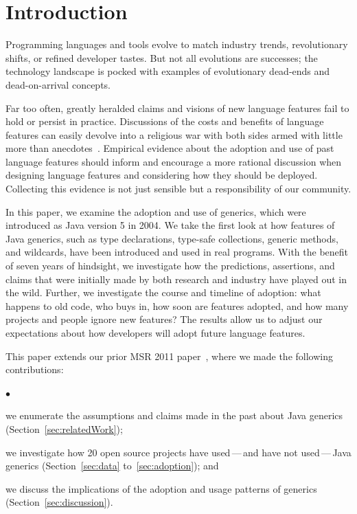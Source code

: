 \documentclass{svjour3}
\newcommand{\squishlist}{
   \begin{list}{$\bullet$}
    { \setlength{\itemsep}{0pt}      \setlength{\parsep}{3pt}
      \setlength{\topsep}{3pt}       \setlength{\partopsep}{0pt}
      \setlength{\leftmargin}{1.5em} \setlength{\labelwidth}{1em}
      \setlength{\labelsep}{0.5em} } }
\newcommand{\squishend}{
    \end{list}  }
\begin{document}
\section{Introduction}

Programming languages and tools evolve to match 
industry trends, revolutionary shifts, or refined developer tastes.
But not all evolutions are successes; the technology landscape is pocked with 
examples of evolutionary dead-ends and dead-on-arrival concepts.

Far too often, greatly heralded claims and visions of new language 
features fail to hold or persist in practice.
Discussions of the costs and benefits of language features can easily devolve
into a religious war with both sides armed with little more than 
anecdotes~\cite{markstrum}.
Empirical evidence about the adoption and use of past language features
should inform and encourage a more rational discussion 
when designing language features and considering how they should be deployed.
Collecting this evidence is not just sensible but a responsibility of our community.

In this paper, we examine the adoption and use of generics, which
were introduced as Java version 5 in 2004. 
We take the first look at how features of Java generics,
such as type declarations, type-safe collections, generic methods, and wildcards, have been
introduced and used in real programs.
With the benefit of seven years of hindsight, we investigate how the predictions,
assertions, and claims that were initially made by both research and industry
have played out in the wild.  Further, we investigate the course and timeline of adoption: 
what happens to old code, who buys in, how soon are features adopted, 
and how many projects and people ignore new features?
The results allow us to adjust our expectations about how developers will
adopt future language features.

This paper extends our prior MSR 2011 paper~\cite{parnin11}, where we made
the following contributions:

\squishlist
  \item we enumerate the assumptions and claims made in the past about Java
  		generics (Section~\ref{sec:relatedWork});
  \item	we investigate how 20 open source projects have used\,---\,and
  		have not used\,---\,Java generics (Section~\ref{sec:data} 
  		to~\ref{sec:adoption}); and
  \item we discuss the implications of the adoption and usage patterns of
  		generics (Section~\ref{sec:discussion}).
\squishend
\end{document}
